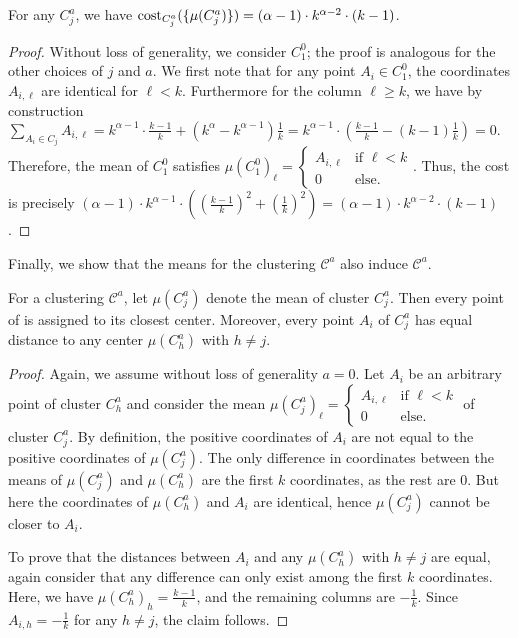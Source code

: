 \begin{fact}
\label{fact:cost}
For any $C_j^a$, we have $\text{cost}_{C_j^a}(\{\mu(C_j^a)\}) = (\alpha-1)\cdot k^{\alpha-2}\cdot (k-1)$.
\end{fact}
\begin{proof}
Without loss of generality, we consider $C_1^0$;  the proof is analogous for the other choices of $j$ and $a$. We first note that for any point $A_i \in C_1^0$, the coordinates $A_{i,\ell}$ are identical for $\ell <k$. Furthermore for the column $\ell\geq k$, we have by construction $\sum_{A_i\in C_j} A_{i,\ell} = k^{\alpha-1}\cdot \frac{k-1}{k} + (k^{\alpha}-k^{\alpha-1})\frac{1}{k}=k^{\alpha-1}\cdot (\frac{k-1}{k} - (k-1)\frac{1}{k}) = 0.$ Therefore, the mean of $C_1^0$ satisfies $\mu(C_1^0)_{\ell} = \begin{cases}A_{i,\ell} &\text{if }\ell<k \\
0 &\text{else.}\end{cases}$. 
Thus, the cost is precisely $(\alpha-1)\cdot k^{\alpha-1}\cdot \left(\left(\frac{k-1}{k}\right)^2 + \left(\frac{1}{k}\right)^2 \right)=(\alpha-1)\cdot k^{\alpha-2}\cdot (k-1)$.
\end{proof}

Finally, we show that the means for the clustering $\mathcal{C}^{a}$ also induce $\mathcal{C}^{a}$.

\begin{fact}
\label{fact:opt}
For a clustering $\mathcal{C}^{a}$, let $\mu(C_j^{a})$ denote the mean of cluster $C_j^a$. Then every point of  is assigned to its closest center. Moreover, every point $A_i$ of $C_j^a$ has equal distance to any center $\mu(C_h^{a})$ with $h\neq j$.
\end{fact}
\begin{proof}
Again, we assume without loss of generality $a=0$.
Let $A_i$ be an arbitrary point of cluster $C_{h}^{a}$ and consider the mean $\mu(C_j^a)_{\ell} = \begin{cases}A_{i,\ell} &\text{if }\ell<k \\
0 &\text{else.}\end{cases}$ of cluster $C_j^a$. By definition, the positive coordinates of $A_i$ are not equal to the positive coordinates of $\mu(C_j^a)$. The only difference in coordinates between the means of $\mu(C_j^a)$ and $\mu(C_h^a)$ are the first $k$ coordinates, as the rest are $0$.
But here the coordinates of $\mu(C_h^a)$ and $A_i$ are identical, hence $\mu(C_j^a)$ cannot be closer to $A_i$.

To prove that the distances between $A_i$ and any $\mu(C_h^{a})$ with $h\neq j$ are equal, again consider that any difference can only exist among the first $k$ coordinates. Here, we have $\mu(C_h^{a})_h = \frac{k-1}{k}$, and the remaining columns are $-\frac{1}{k}$. Since $A_{i,h} = -\frac{1}{k}$ for any $h\neq j$, the claim follows.
\end{proof}

